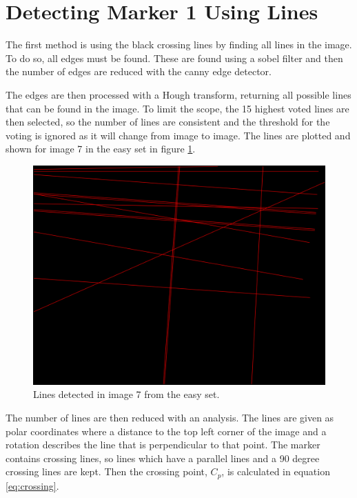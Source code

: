 \section{Detecting Marker 1 Using Lines}\label{sec:using_lines}
The first method is using the black crossing lines by finding all lines in the image.
To do so, all edges must be found.
These are found using a sobel filter and then the number of edges are reduced with the canny edge detector.

The edges are then processed with a Hough transform, returning all possible lines that can be found in the image.
To limit the scope, the 15 highest voted lines are then selected, so the number of lines are consistent and the threshold for the voting is ignored as it will change from image to image.
The lines are plotted and shown for image 7 in the easy set in figure \ref{fig:lines_in_image}.


\begin{figure}[H]
 \centering
 \includegraphics[width=\fullImageWidth]{graphics/Lines_in_image}
 \caption{Lines detected in image 7 from the easy set.}
 \label{fig:lines_in_image}
\end{figure}

The number of lines are then reduced with an analysis.
The lines are given as polar coordinates where a distance to the top left corner of the image and a rotation describes the line that is perpendicular to that point.
The marker contains crossing lines, so lines which have a parallel lines and a 90 degree crossing lines are kept.
Then the crossing point, $C_p$, is calculated in equation \ref{eq:crossing}.%

